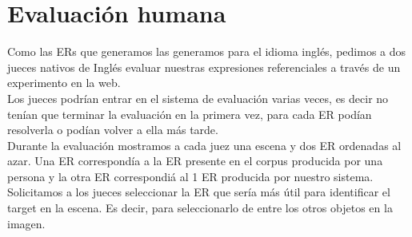  

\section{Evaluaci\'on humana} \label{sec:humanevaluation}




Como las ERs que generamos las generamos para el idioma ingl\'es, pedimos a dos jueces nativos de Ingl\'es evaluar nuestras expresiones referenciales a trav\'es de un experimento en la web. \\

Los jueces podr\'{i}an entrar en el sistema de evaluaci\'on varias veces, es decir no ten\'ian que terminar la evaluaci\'on en la primera vez, para cada ER pod\'ian resolverla o pod\'ian volver a ella m\'as tarde. \\

Durante la evaluaci\'on mostramos a cada juez una escena y dos ER ordenadas al azar. Una ER correspond\'ia a la ER presente en el corpus producida por una persona y la otra ER correspondi\'a al 1 ER producida por nuestro sistema. Solicitamos a los jueces seleccionar la ER que ser\'{i}a m\'as \'util para identificar el target en la escena. Es decir, para seleccionarlo de entre los otros objetos en la imagen.\\

